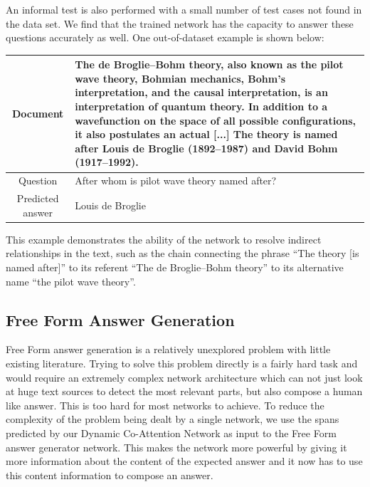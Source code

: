 An informal test is also performed with a small number of test cases not found in the data set. We find that the trained network has the capacity to answer these questions accurately as well. One out-of-dataset example is shown below:

\begin{table}
\begin{tabular}{|c|p{}|}
    \hline
    Document & The de Broglie–Bohm theory, also known as the pilot wave theory, Bohmian mechanics, Bohm's interpretation, and the causal interpretation, is an interpretation of quantum theory. In addition to a wavefunction on the space of all possible configurations, it also postulates an actual [...] The theory is named after Louis de Broglie (1892–1987) and David Bohm (1917–1992). \\
    \hline
    Question & After whom is pilot wave theory named after? \\
    \hline
    Predicted answer & Louis de Broglie \\
    \hline
\end{tabular}
\end{table}

This example demonstrates the ability of the network to resolve indirect relationships in the text, such as the chain connecting the phrase ``The theory [is named after]'' to its referent ``The de Broglie–Bohm theory'' to its alternative name ``the pilot wave theory''.

\subsection{Free Form Answer Generation}

Free Form answer generation is a relatively unexplored problem with little existing literature. Trying to solve this problem directly is a fairly hard task and would require an extremely complex network architecture which can not just look at huge text sources to detect the most relevant parts, but also compose a human like answer. This is too hard for most networks to achieve. To reduce the complexity of the problem being dealt by a single network, we use the spans predicted by our Dynamic Co-Attention Network as input to the Free Form answer generator network. This makes the network more powerful by giving it more information about the content of the expected answer and it now has to use this content information to compose an answer. \\

